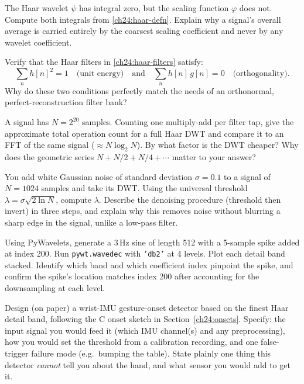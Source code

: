 \begin{exercise}
\label{ch24:ex-zeromean}
The Haar wavelet $\psi$ has integral zero, but the scaling function $\varphi$ does
not. Compute both integrals from \eqref{ch24:haar-defn}. Explain why a signal's
overall average is carried entirely by the coarsest scaling coefficient and never
by any wavelet coefficient.
\end{exercise}

\begin{exercise}
\label{ch24:ex-filters}
Verify that the Haar filters in \eqref{ch24:haar-filters} satisfy:
\[
  \sum_n h[n]^2 = 1 \quad \text{(unit energy)} \quad \text{and} \quad \sum_n h[n]\,g[n] = 0 \quad \text{(orthogonality)}.
\]
Why do these two conditions perfectly match the needs of an orthonormal, perfect-reconstruction filter bank?
\end{exercise}

\begin{exercise}
\label{ch24:ex-cost}
A signal has $N = 2^{20}$ samples. Counting one multiply-add per filter tap, give
the approximate total operation count for a full Haar DWT and compare it to an
FFT of the same signal ($\approx N\log_2 N$). By what factor is the DWT cheaper?
Why does the geometric series $N + N/2 + N/4 + \cdots$ matter to your answer?
\end{exercise}

\begin{exercise}
\label{ch24:ex-denoise}
You add white Gaussian noise of standard deviation $\sigma = 0.1$ to a signal of
$N = 1024$ samples and take its DWT. Using the universal threshold
$\lambda = \sigma\sqrt{2\ln N}$, compute $\lambda$. Describe the denoising
procedure (threshold then invert) in three steps, and explain why this removes
noise without blurring a sharp edge in the signal, unlike a low-pass filter.
\end{exercise}

\begin{exercise}
\label{ch24:ex-pywt}
Using PyWavelets, generate a 3\,Hz sine of length 512 with a 5-sample spike added
at index 200. Run \texttt{pywt.wavedec} with \texttt{'db2'} at 4 levels. Plot each
detail band stacked. Identify which band and which coefficient index pinpoint the
spike, and confirm the spike's location matches index 200 after accounting for the
downsampling at each level.
\end{exercise}

\begin{exercise}
\label{ch24:ex-onset}
Design (on paper) a wrist-IMU gesture-onset detector based on the finest Haar
detail band, following the C onset sketch in Section~\ref{ch24:onsets}. Specify: the input signal you would
feed it (which IMU channel(s) and any preprocessing), how you would set the
threshold from a calibration recording, and one false-trigger failure mode (e.g.\
bumping the table). State plainly one thing this detector \emph{cannot} tell you
about the hand, and what sensor you would add to get it.
\end{exercise}

